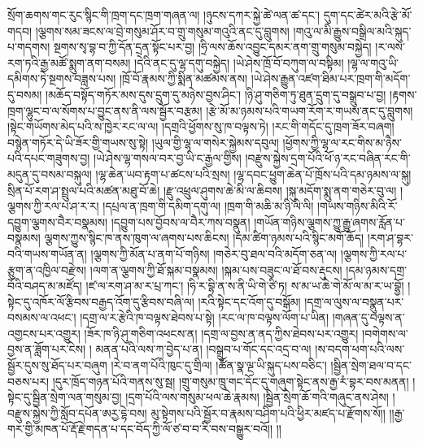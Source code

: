 སྲོག་ཆགས་གང་རུང་སྙིང་གི་ཁྲག་དང་ཁྲག་གཞན་ལ། །ཉུངས་དཀར་སྐྱེ་ཚེ་ལན་ཚ་དང་། དུག་དང་ཚེར་མའི་རྩེ་མོ་གདབ། །ལྕགས་སམ་ཟངས་ལ་བྲེ་གསུམ་ཤོར་བ་གྲུ་གསུམ་གའུའི་ནང་དུ་བླུགས། །གའུ་ལ་མི་རྒྱུས་བསྒྲིལ་མའི་སྐུད་པ་གདགས། སྔགས་སྭ་བྷ་བ་ཀྱི་དོན་དྲན་སྟོང་པར་བྱ། །ཧྲི་ལས་ཆོས་འབྱུང་དམར་ནག་གྲུ་གསུམ་བསྐྱེད། །ར་ལས་རག་ཏའི་རྒྱ་མཚོ་སྨུག་ནག་བསམ། །དེའི་ནང་དུ་ལྷ་དགུ་བསྐྱེད། །ཡེ་ཤེས་ཁྲོ་བོ་བཀུག་ལ་བསྟིམ། །ལྷ་ལ་གའུ་ཡི་དམིགས་ཏེ་སྔགས་བཟླས་པས། །ཁྲོ་བོ་རྣམས་ཀྱི་སྨིན་མཚམས་ནས། །ཡེ་ཤེས་རྒྱུན་འཛག་ཐིམ་པར་ཁྲག་གི་མདོག་དུ་བསམ། །མཆོད་བསྟོད་གཏོར་མས་དུས་དྲུག་དུ་མཉེས་བྱས་ཤིང་། །ཉི་ཤུ་གཅིག་ཏུ་ཐུན་དྲུག་དུ་བསྒྲུབ་པ་བྱ། །རྟགས་ཁྲག་ལྷུང་བ་ལ་སོགས་པ་བྱུང་ནས་ནི་ལས་སྦྱོར་བརྩམ། །རྩེ་མོ་མ་ཉམས་པའི་གཡག་རོག་ར་གཡས་ནང་དུ་བླུགས། །སྟེང་གཡོགས་མེད་པའི་ས་ཁྱེར་རང་ལ་ལ། །དགྲའི་ཕྱོགས་སུ་ཁ་བལྟས་ཏེ། །རང་གི་གདོང་དུ་ཁྲག་ཟོར་བཞག། བསྙེན་གཏོར་དེ་ཡི་ཟོར་གྱི་གཡས་སུ་སྟེ། །ཡུལ་གྱི་ལྷ་ལ་གསེར་སྐྱེམས་དབུལ། །ཕྱོགས་ཀྱི་ལྷ་ལ་རང་གིས་མ་ཉཻས་པའི་དཔང་གཟུགས་བྱ། །ཡེ་ཤེས་ལྷ་གསལ་བར་བྱ་ཡི་ང་རྒྱལ་གྱིས། །བརྫུས་སྐྱེས་དྲག་པོའི་ཕོ་ཉ་རང་བཞིན་རང་གི་མདུན་དུ་བསམ་བསྐུལ། །ལྷ་ཆེན་ཡབ་རྟག་པ་ཚངས་པའི་སྲས། །ལྷ་དབང་ཕྱུག་ཆེན་པོ་ཁྲོས་པའི་དམ་ཉམས་ལ་སྐུ། སྲིན་པོ་རག་ཤ་སྤྲུལ་པའི་མཚན་མཐུ་བོ་ཆེ། །རྫུ་འཕྲུལ་ཤུགས་ཆེ་མི་ལ་ཆིབས། །སྐུ་མདོག་སྨུ་ནག་གཅེར་བུ་ལ། །ལྕགས་ཀྱི་རལ་པ་ཤ་ར་ར། །དཔྲལ་ན་ཁྲག་གི་དམིག་དགུ་ལ། །ཁྲག་གི་མཆི་མ་ཉི་ལི་ལི། །གཡས་གཉིས་མིའི་རོ་དབྱུག་ལྕགས་བཻར་བསྣམས། །དབྱུག་པས་བྱོབས་ལ་བཻར་ཀས་བསྣུན། །གཡོན་གཉིས་ལྕགས་ཀྱུ་རྒྱུ་ཞགས་རློན་པ་བསྣམས། ལྕགས་ཀྱུས་སྙིང་ཁ་ནས་ཁུག་ལ་ཞགས་པས་ཆིངས། །དམ་ཚིག་ཉམས་པའི་སྙིང་མགོ་ཆོད། །རག་ཤ་བྷར་བའི་གཡས་གཡོན་ན། །ལྕགས་ཀྱི་མོན་པ་ནག་པོ་གཉིས། །གཅེར་བུ་ཐལ་བའི་མདོག་ཅན་ལ། །ལྕགས་ཀྱི་རལ་པ་རྩུག་ན་འཁྱིལ་བརྫེས། །ལག་ན་ལྕགས་ཀྱི་ཐོ་སྐམ་བསྣམས། །སྐམ་པས་བཟུང་ལ་ཐོ་བས་རྡུངས། །དམ་ཉམས་དགྲ་བོའི་བཤད་མ་མཛོད། །ཛ་ལ་རག་ཤ་མ་ར་པྲ་ཀང་། །ཧི་ར་བྷི་ན་ས་ནི་ཡི་གེ་ཙི་ཏ། ས་མ་ཡ་ཆེ་གེ་མོ་ལ་མ་ར་ཡ་བྷྱོ། །སྟེང་དུ་འཁོར་ལོ་རྩིབས་བརྒྱད་འོག་དུ་རྩིབས་བཞི་ལ། །རའི་སྟེང་དང་འོག་དུ་བསྒོམ། །དགྲ་ལ་ལུས་ལ་བསྣུན་པར་བསམས་ལ་འཕང་། །དགྲ་ལ་ར་རྩེའི་ཁ་བལྟས་ཐེབས་པ་སྟེ། །རང་ལ་ཁ་བལྟས་ལོག་པ་ཡིན། །གཞན་དུ་བལྟས་ན་འགྱངས་པར་འགྱུར། །ཟོར་ཁ་ཉི་ཤུ་གཅིག་འཕངས་ན། །དགྲ་ལ་བྱས་ན་ནད་ཀྱིས་ཐེབས་པར་འགྱུར། །བགེགས་ལ་བྱས་ན་ཟློག་པར་ངེས། །
མནན་པའི་ལས་ཀ་བྱེད་པ་ན། །བསྒྲུབ་པ་གོང་དང་འདྲ་བ་ལ། །ས་བདག་ཕག་པའི་ལས་སྦྱོར་དུས་སུ་ཐོད་པར་བཞུག །རེ་བ་ནག་པོའི་ཁུང་དུ་གྲིལ། །ཚོན་སྣ་ལྔ་ཡི་སྐུད་པས་བཅིང་། །སྦྱིན་སྲེག་ཐལ་བ་དང་བཅས་པར། །དུར་ཁྲོད་གཉན་པོའི་གནས་སུ་སྦ། །གྲུ་གསུམ་ཁྲུ་གང་དོང་དུ་གཞུག་སྟེང་ནས་རྒྱ་རཾ་བྷར་བས་མནན། །སྟེང་དུ་སྦྱིན་སྲེག་ལན་གསུམ་བྱ། །དྲག་པོའི་ལས་གསུམ་ཕལ་ཆེ་རྣམས། །སྦྱིན་སྲེག་ཆོ་གའི་གཞུང་ནས་ཤེས། །བརྫུས་སྐྱེས་ཀྱི་སློབ་དཔོན་ཨརྱ་དྷེ་བས། མུ་སྟེགས་པའི་སྦྱོར་བ་རྣམས་བཤིག་པའི་ཕྱིར་མཛད་པ་རྫོགས་སོ།། །།རྒྱ་གར་གྱི་མཁན་པོ་རྡོ་རྗེ་གདན་པ་དང་བོད་ཀྱི་ལོ་ཙ་བ་བ་རི་བས་བསྒྱུར་བའོ།། །།